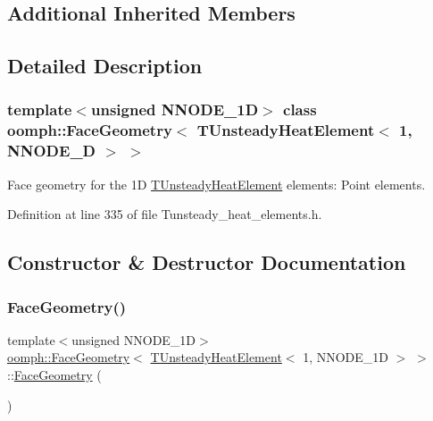 \subsection*{Additional Inherited Members}


\subsection{Detailed Description}
\subsubsection*{template$<$unsigned N\+N\+O\+D\+E\+\_\+1D$>$\newline
class oomph\+::\+Face\+Geometry$<$ T\+Unsteady\+Heat\+Element$<$ 1, N\+N\+O\+D\+E\+\_\+D $>$ $>$}

Face geometry for the 1D \hyperlink{classoomph_1_1TUnsteadyHeatElement}{T\+Unsteady\+Heat\+Element} elements\+: Point elements. 

Definition at line 335 of file Tunsteady\+\_\+heat\+\_\+elements.\+h.



\subsection{Constructor \& Destructor Documentation}
\mbox{\label{classoomph_1_1FaceGeometry_3_01TUnsteadyHeatElement_3_011_00_01NNODE__1D_01_4_01_4_ab38443959b2c1d097897f4e35fefdde2}} 
\subsubsection{\texorpdfstring{Face\+Geometry()}{FaceGeometry()}}
{\footnotesize\ttfamily template$<$unsigned N\+N\+O\+D\+E\+\_\+1D$>$ \\
\hyperlink{classoomph_1_1FaceGeometry}{oomph\+::\+Face\+Geometry}$<$ \hyperlink{classoomph_1_1TUnsteadyHeatElement}{T\+Unsteady\+Heat\+Element}$<$ 1, N\+N\+O\+D\+E\+\_\+1D $>$ $>$\+::\hyperlink{classoomph_1_1FaceGeometry}{Face\+Geometry} (\begin{DoxyParamCaption}{ }\end{DoxyParamCaption})\hspace{0.3cm}{\ttfamily [inline]}}



